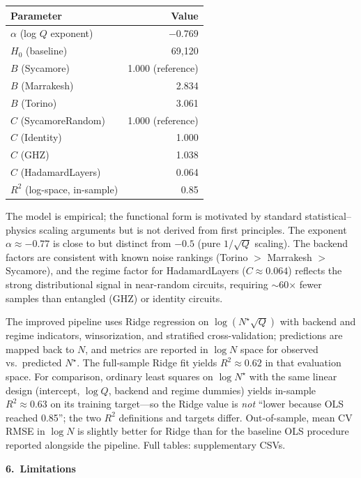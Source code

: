 \documentclass[11pt,a4paper]{article}
\begin{document}
\begin{center}
\begin{tabular}{@{}l r@{}}
\hline
Parameter & Value \\
\hline
$\alpha$ (log $Q$ exponent) & $-0.769$ \\
$H_0$ (baseline) & 69{,}120 \\
$B$ (Sycamore) & 1.000 (reference) \\
$B$ (Marrakesh) & 2.834 \\
$B$ (Torino) & 3.061 \\
$C$ (SycamoreRandom) & 1.000 (reference) \\
$C$ (Identity) & 1.000 \\
$C$ (GHZ) & 1.038 \\
$C$ (HadamardLayers) & 0.064 \\
$R^2$ (log-space, in-sample) & 0.85 \\
\hline
\end{tabular}
\end{center}

The model is empirical; the functional form is motivated by standard statistical--physics scaling arguments but is not derived from first principles. The exponent $\alpha\approx -0.77$ is close to but distinct from $-0.5$ (pure $1/\sqrt{Q}$ scaling). The backend factors are consistent with known noise rankings (Torino $>$ Marrakesh $>$ Sycamore), and the regime factor for HadamardLayers ($C\approx 0.064$) reflects the strong distributional signal in near-random circuits, requiring $\sim$60$\times$ fewer samples than entangled (GHZ) or identity circuits.

The improved pipeline uses Ridge regression on $\log(N^\star\sqrt{Q})$ with backend and regime indicators, winsorization, and stratified cross-validation; predictions are mapped back to $N$, and metrics are reported in $\log N$ space for observed vs.\ predicted $N^\star$. The full-sample Ridge fit yields $R^2 \approx 0.62$ in that evaluation space. For comparison, ordinary least squares on $\log N^\star$ with the same linear design (intercept, $\log Q$, backend and regime dummies) yields in-sample $R^2 \approx 0.63$ on its training target---so the Ridge value is \emph{not} ``lower because OLS reached 0.85''; the two $R^2$ definitions and targets differ. Out-of-sample, mean CV RMSE in $\log N$ is slightly better for Ridge than for the baseline OLS procedure reported alongside the pipeline. Full tables: supplementary CSVs.

\vspace{0.5em}
\textbf{6.\ Limitations}
\end{document}
